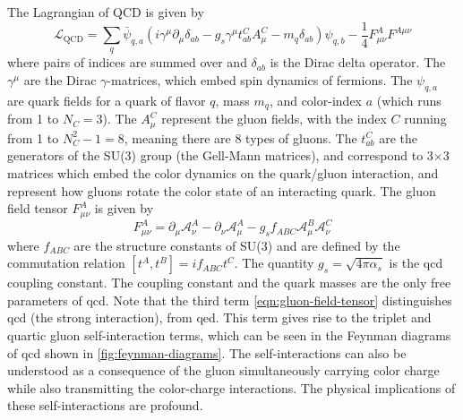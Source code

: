 The Lagrangian of QCD is given by
\begin{equation}
  \label{eqn:qcd-lagrangian}  
  \mathcal{L}_{\text{QCD}} = \sum_q \bar{\psi}_{q,a} \left( i\gamma^\mu \partial_\mu \delta_{ab} - g_s \gamma^\mu t_{ab}^{C} A_{\mu}^C - m_q \delta_{ab}\right)\psi_{q,b} - \frac{1}{4}F_{\mu\nu}^{A} F^{A\mu\nu}
\end{equation}
where pairs of indices are summed over and $\delta_{ab}$ is the Dirac delta operator.
The $\gamma^\mu$ are the Dirac $\gamma$-matrices, which embed spin dynamics of fermions.
The $\psi_{q,a}$ are quark fields for a quark of flavor $q$, mass $m_q$, and color-index $a$ (which runs from 1 to $N_C = 3$).
The $A_\mu^C$ represent the gluon fields, with the index $C$ running from 1 to $N_C^2 -1 = 8$, meaning there are 8 types of gluons.
The $t_{ab}^C$ are the generators of the SU(3) group (the Gell-Mann matrices), and correspond to 3$\times$3 matrices which embed the color dynamics on the quark/gluon interaction, and represent how gluons rotate the color state of an interacting quark.
The gluon field tensor $F^{A}_{\mu\nu}$ is given by
\begin{equation}
  \label{eqn:gluon-field-tensor}
  F_{\mu\nu}^A = \partial_\mu \mathcal{A}_\nu^A - \partial_\nu \mathcal{A}_\mu^A - g_s f_{ABC} \mathcal{A}_\mu^B \mathcal{A}_\nu^C
\end{equation}
where $f_{ABC}$ are the structure constants of SU(3) and are defined by the commutation relation $[t^A,t^B] = if_{ABC}t^C$.
The quantity $g_s = \sqrt{4\pi\alpha_s}$ is the \gls{qcd} coupling constant. The coupling constant and the quark masses are the only free parameters of \gls{qcd}.
Note that the third term \ref{eqn:gluon-field-tensor} distinguishes \gls{qcd} (the strong interaction), from \gls{qed}.
This term gives rise to the triplet and quartic gluon self-interaction terms, which can be seen in the Feynman diagrams of \gls{qcd} shown in \ref{fig:feynman-diagrams}.
The self-interactions can also be understood as a consequence of the gluon simultaneously carrying color charge while also transmitting the color-charge interactions.
The physical implications of these self-interactions are profound. 



